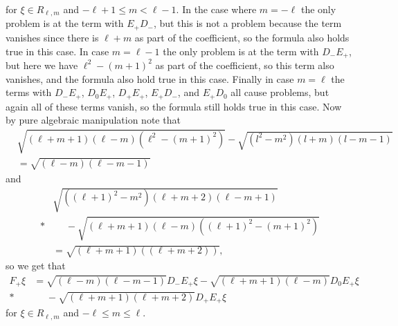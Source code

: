 for $\xi\in R_{\ell,m}$ and $-\ell+1 \leq m < \ell-1$. In the case where $m=-\ell$ the only problem is at the term with $E_+D_-$, but this is not a problem because the term vanishes since there is $\ell+m$ as part of the coefficient, so the formula also holds true in this case. In case $m=\ell-1$ the only problem is at the term with $D_-E_+$, but here we have $\ell^2-(m+1)^2$ as part of the coefficient, so this term also vanishes, and the formula also hold true in this case. Finally in case $m=\ell$ the terms with $D_-E_+$, $D_0E_+$, $D_+E_+$, $E_+D_-$, and $E_+D_0$ all cause problems, but again all of these terms vanish, so the formula still holds true in this case. Now by pure algebraic manipulation note that 
\begin{align*}
  &\sqrt{(\ell+m+1)(\ell-m)(\ell^2-(m+1)^2)} - \sqrt{(l^2-m^2)(l+m)(l-m-1)} \\
  &= \sqrt{(\ell-m)(\ell-m-1)}
\end{align*}
and
\begin{align*}
  &\sqrt{((\ell+1)^2-m^2)(\ell+m+2)(\ell-m+1)} \\*
  &\phantom{{}={}}{} - \sqrt{(\ell+m+1)(\ell-m)((\ell+1)^2-(m+1)^2)} \\
  &= \sqrt{(\ell+m+1)((\ell+m+2))},
\end{align*}
so we get that
\begin{align*}
  F_+ \xi &= \sqrt{(\ell-m)(\ell-m-1)} D_-E_+ \xi - \sqrt{(\ell+m+1)(\ell-m)} D_0E_+\xi \\*
  &\phantom{{}={}}{} - \sqrt{(\ell+m+1)(\ell+m+2)} D_+E_+\xi
\end{align*}
for $\xi\in R_{\ell,m}$ and $-\ell \leq m \leq \ell$.

